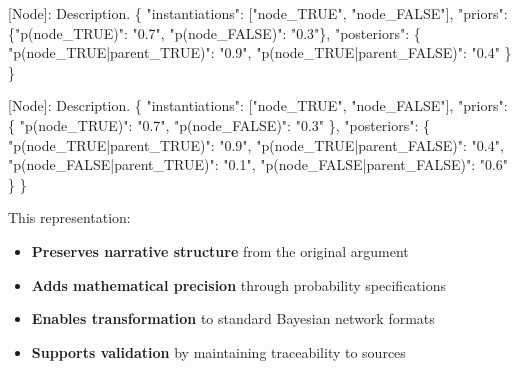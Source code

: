 \documentclass[
  11pt,
  letterpaper,
]{book}
\newenvironment{Shaded}{\begin{snugshade}}{\end{snugshade}}
\newcommand{\DataTypeTok}[1]{\textcolor[rgb]{0.68,0.00,0.00}{#1}}
\newcommand{\ErrorTok}[1]{\textcolor[rgb]{0.68,0.00,0.00}{#1}}
\newcommand{\FunctionTok}[1]{\textcolor[rgb]{0.28,0.35,0.67}{#1}}
\newcommand{\OtherTok}[1]{\textcolor[rgb]{0.00,0.23,0.31}{#1}}
\newcommand{\StringTok}[1]{\textcolor[rgb]{0.13,0.47,0.30}{#1}}
\providecommand{\tightlist}{%
  \setlength{\itemsep}{0pt}\setlength{\parskip}{0pt}}
\begin{document}
\begin{Shaded}
\begin{Highlighting}[]
\OtherTok{[}\ErrorTok{Node}\OtherTok{]}\ErrorTok{:} \ErrorTok{Description.} \FunctionTok{\{}
  \DataTypeTok{"instantiations"}\FunctionTok{:} \OtherTok{[}\StringTok{"node\_TRUE"}\OtherTok{,} \StringTok{"node\_FALSE"}\OtherTok{]}\FunctionTok{,}
  \DataTypeTok{"priors"}\FunctionTok{:} \FunctionTok{\{}\DataTypeTok{"p(node\_TRUE)"}\FunctionTok{:} \StringTok{"0.7"}\FunctionTok{,} \DataTypeTok{"p(node\_FALSE)"}\FunctionTok{:} \StringTok{"0.3"}\FunctionTok{\},}
  \DataTypeTok{"posteriors"}\FunctionTok{:} \FunctionTok{\{}
    \DataTypeTok{"p(node\_TRUE|parent\_TRUE)"}\FunctionTok{:} \StringTok{"0.9"}\FunctionTok{,}
    \DataTypeTok{"p(node\_TRUE|parent\_FALSE)"}\FunctionTok{:} \StringTok{"0.4"}
  \FunctionTok{\}}
\FunctionTok{\}}
\end{Highlighting}
\end{Shaded}

\begin{Shaded}
\begin{Highlighting}[]
\OtherTok{[}\ErrorTok{Node}\OtherTok{]}\ErrorTok{:} \ErrorTok{Description.} \FunctionTok{\{}
  \DataTypeTok{"instantiations"}\FunctionTok{:} \OtherTok{[}\StringTok{"node\_TRUE"}\OtherTok{,} \StringTok{"node\_FALSE"}\OtherTok{]}\FunctionTok{,}
  \DataTypeTok{"priors"}\FunctionTok{:} \FunctionTok{\{}
    \DataTypeTok{"p(node\_TRUE)"}\FunctionTok{:} \StringTok{"0.7"}\FunctionTok{,}
    \DataTypeTok{"p(node\_FALSE)"}\FunctionTok{:} \StringTok{"0.3"}
  \FunctionTok{\},}
  \DataTypeTok{"posteriors"}\FunctionTok{:} \FunctionTok{\{}
    \DataTypeTok{"p(node\_TRUE|parent\_TRUE)"}\FunctionTok{:} \StringTok{"0.9"}\FunctionTok{,}
    \DataTypeTok{"p(node\_TRUE|parent\_FALSE)"}\FunctionTok{:} \StringTok{"0.4"}\FunctionTok{,}
    \DataTypeTok{"p(node\_FALSE|parent\_TRUE)"}\FunctionTok{:} \StringTok{"0.1"}\FunctionTok{,}
    \DataTypeTok{"p(node\_FALSE|parent\_FALSE)"}\FunctionTok{:} \StringTok{"0.6"}
  \FunctionTok{\}}
\FunctionTok{\}}
\end{Highlighting}
\end{Shaded}

This representation:

\begin{itemize}
\tightlist
\item
  \textbf{Preserves narrative structure} from the original argument
\item
  \textbf{Adds mathematical precision} through probability
  specifications
\item
  \textbf{Enables transformation} to standard Bayesian network formats
\item
  \textbf{Supports validation} by maintaining traceability to sources
\end{itemize}
\end{document}
